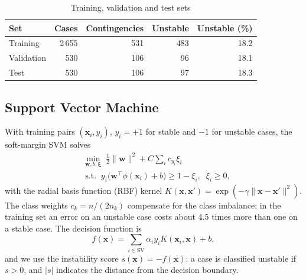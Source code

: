\documentclass[conference]{IEEEtran}
\begin{document}
\begin{table}[t]
\caption{Training, validation and test sets}
\label{tab:split}
\centering
\begin{tabular}{lrrrr}
\toprule
Set & Cases & Contingencies & Unstable & Unstable (\%) \\
\midrule
Training   & 2\,655 & 531 & 483 & 18.2 \\
Validation & 530    & 106 & 96  & 18.1 \\
Test       & 530    & 106 & 97  & 18.3 \\
\bottomrule
\end{tabular}
\end{table}

\subsection{Support Vector Machine}
With training pairs $(\mathbf{x}_i, y_i)$, $y_i = +1$ for stable and $-1$ for unstable cases, the soft-margin SVM
solves
\begin{equation}
\begin{aligned}
  &\min_{\mathbf{w}, b, \boldsymbol{\xi}} \; \tfrac{1}{2}\lVert\mathbf{w}\rVert^2 + C\sum_i c_{y_i}\xi_i \\
  &\;\text{s.t.} \;\; y_i\bigl(\mathbf{w}^\top\phi(\mathbf{x}_i) + b\bigr) \ge 1 - \xi_i,\;\; \xi_i \ge 0,
\end{aligned}
\end{equation}
with the radial basis function (RBF) kernel
$K(\mathbf{x}, \mathbf{x}') = \exp(-\gamma\lVert\mathbf{x} - \mathbf{x}'\rVert^2)$.
The class weights $c_k = n/(2n_k)$ compensate for the class imbalance; in the training set an error on an unstable
case costs about 4.5 times more than one on a stable case. The decision function is
\begin{equation}
  f(\mathbf{x}) = \sum_{i \in \mathrm{SV}} \alpha_i y_i K(\mathbf{x}_i, \mathbf{x}) + b,
\end{equation}
and we use the instability score $s(\mathbf{x}) = -f(\mathbf{x})$: a case is classified unstable if $s > 0$, and
$|s|$ indicates the distance from the decision boundary.
\end{document}
